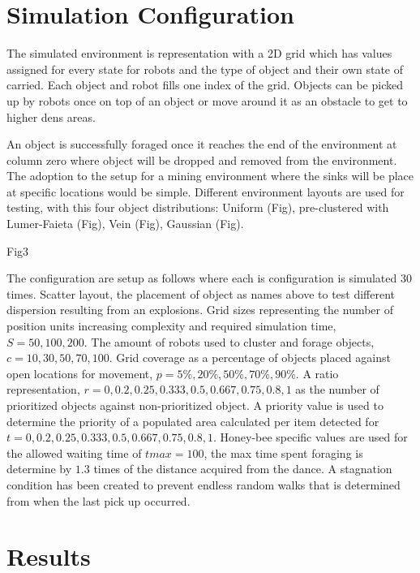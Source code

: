 \documentclass[12pt]{article}
\begin{document}
\section*{Simulation Configuration}

\par{The simulated environment is representation with a 2D grid which has values assigned for every state for robots and the type of object and their own state of carried. Each object and robot fills one index of the grid. Objects can be picked up by robots once on top of an object or move around it as an obstacle to get to higher dens areas.}
\\
\par{An object is successfully foraged once it reaches the end of the environment at column zero where object will be dropped and removed from the environment. The adoption to the setup for a mining environment where the sinks will be place at specific locations would be simple. Different environment layouts are used for testing, with this four object distributions: Uniform (Fig), pre-clustered with Lumer-Faieta (Fig), Vein (Fig), Gaussian (Fig).}
\\
\par{Fig3}
\\
\par{The configuration are setup as follows where each is configuration is simulated 30 times. Scatter layout, the placement of object as names above to test different dispersion resulting from an explosions. Grid sizes representing the number of position units increasing complexity and required simulation time, $S = 50, 100, 200$. The amount of robots used to cluster and forage objects, $c = 10, 30, 50, 70, 100$. Grid coverage as a percentage of objects placed against open locations for movement, $p = 5\%, 20\%, 50\%, 70\%, 90\%$. A ratio representation, $r = 0, 0.2, 0.25, 0.333, 0.5, 0.667, 0.75, 0.8, 1$ as the number of prioritized objects against non-prioritized object. A priority value is used to determine the priority of a populated area calculated per item detected for $t = 0, 0.2, 0.25, 0.333, 0.5, 0.667, 0.75, 0.8, 1$. Honey-bee specific values are used for the allowed waiting time of $tmax = 100$, the max time spent foraging is determine by $1.3$ times of the distance acquired from the dance. A stagnation condition has been created to prevent endless random walks that is determined from when the last pick up occurred.}

\section*{Results}
\end{document}
